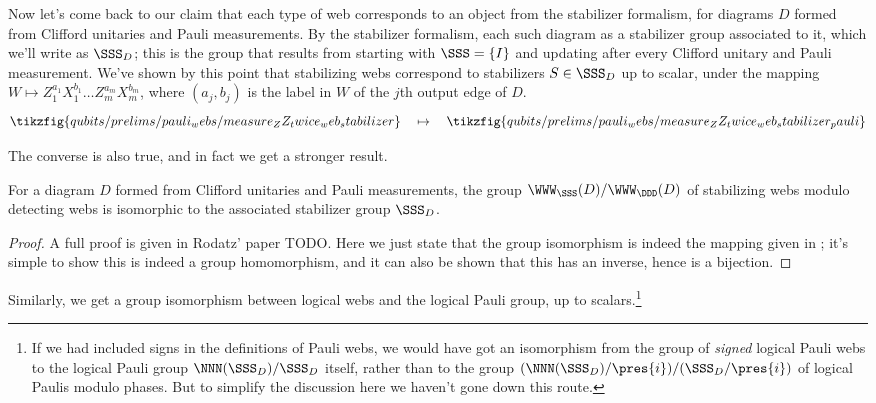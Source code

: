 Now let's come back to our claim that each type of web corresponds to an object from the stabilizer formalism,
for diagrams $D$ formed from Clifford unitaries and Pauli measurements.
By the stabilizer formalism, each such diagram as a stabilizer group associated to it, which we'll write as $\SSS_D$; this is the group that results from starting with $\SSS = \{I\}$ and updating after every Clifford unitary and Pauli measurement.
We've shown by this point that stabilizing webs correspond to stabilizers $S \in \SSS_D$ up to scalar, under the mapping $W \mapsto Z_1^{a_1} X_1^{b_1} \ldots Z_m^{a_m} X_m^{b_m}$, where $(a_j, b_j)$ is the label in $W$ of the $j$th output edge of $D$.
\begin{equation}\label{eq:stabilizer_web_to_pauli_map}
    \tikzfig{qubits/prelims/pauli_webs/measure_ZZ_twice_web_stabilizer}
    \quad \mapsto \quad
    \tikzfig{qubits/prelims/pauli_webs/measure_ZZ_twice_web_stabilizer_pauli}
\end{equation}

The converse is also true, and in fact we get a stronger result.

\begin{proposition}\label{prop:stabilizer_webs_iso}
    For a diagram $D$ formed from Clifford unitaries and Pauli measurements, the group $\WWW_\SSS(D)/\WWW_\DDD(D)$ of stabilizing webs modulo detecting webs is isomorphic to the associated stabilizer group $\SSS_D$.
    \begin{proof}
        A full proof is given in Rodatz' paper TODO.
        Here we just state that the group isomorphism is indeed the mapping given in ; it's simple to show this is indeed a group homomorphism, and it can also be shown that this has an inverse, hence is a bijection.
    \end{proof}
\end{proposition}

Similarly, we get a group isomorphism between logical webs and the logical Pauli group, up to scalars.\footnote{If we had included signs in the definitions of Pauli webs, we would have got an isomorphism from the group of \textit{signed} logical Pauli webs to the logical Pauli group $\NNN(\SSS_D)/\SSS_D$ itself, rather than to the group $(\NNN(\SSS_D)/\pres{i})/(\SSS_D/\pres{i})$ of logical Paulis modulo phases.
But to simplify the discussion here we haven't gone down this route.}

